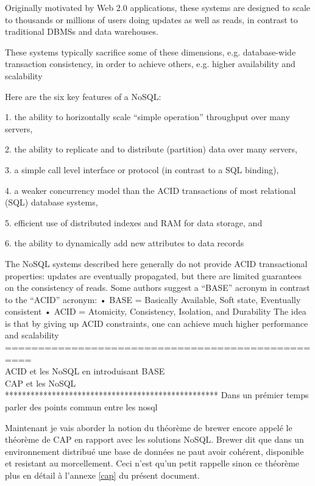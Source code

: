 Originally motivated by Web 2.0 applications, these
systems are designed to scale to thousands or millions
of users doing updates as well as reads, in contrast to
traditional DBMSs and data warehouses.

These systems typically sacrifice some of
these dimensions, e.g. database-wide transaction
consistency, in order to achieve others, e.g. higher
availability and scalability

Here are the six key features of a \textsf{NoSQL}:

1. the ability to horizontally scale “simple
operation” throughput over many servers,

2. the ability to replicate and to distribute (partition)
data over many servers,

3. a simple call level interface or protocol (in
contrast to a SQL binding),

4. a weaker concurrency model than the ACID
transactions of most relational (SQL) database
systems,

5. efficient use of distributed indexes and RAM for
data storage, and

6. the ability to dynamically add new attributes to
data records

The NoSQL systems described here generally do not
provide ACID transactional properties: updates are
eventually propagated, but there are limited guarantees
on the consistency of reads. Some authors suggest a
“BASE” acronym in contrast to the “ACID” acronym:
• BASE = Basically Available, Soft state,
Eventually consistent
• ACID = Atomicity, Consistency, Isolation, and
Durability
The idea is that by giving up ACID constraints, one
can achieve much higher performance and scalability\\
==================================================\\
ACID et les NoSQL en introduisant BASE\\
CAP et les NoSQL\\

**************************************************
Dans un prémier temps parler des points commun entre
les nosql

Maintenant je vais aborder la notion du théorème de brewer encore appelé
le théorème de CAP en rapport avec les solutions \textsf{NoSQL}. 
\textsf{Brewer} dit que dans un environnement distribué 
une base de données ne paut avoir cohérent, disponible et resistant
au morcellement. Ceci n'est qu'un petit rappelle sinon ce théorème 
plus en détail à l'annexe \ref{cap} du présent document.  
